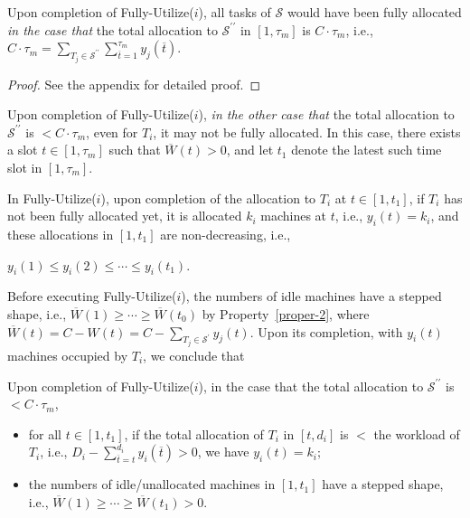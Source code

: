 \documentclass[10pt,journal,compsoc]{IEEEtran}
\begin{document}
\begin{lemma}\label{exit-condition-1}
Upon completion of Fully-Utilize($i$), all tasks of $\mathcal{S}$ would have been fully allocated {\em in the case that} the total allocation to $\mathcal{S}^{\prime\prime}$ in $[1, \tau_{m}]$ is $C\cdot\tau_{m}$, i.e., $C\cdot\tau_{m} = \sum_{T_{j}\in\mathcal{S}^{\prime\prime}}{\sum_{\overline{t}=1}^{\tau_{m}}{y_{j}(\overline{t})}}$.
\end{lemma}
\begin{proof}
See the appendix for detailed proof.
\end{proof}










Upon completion of Fully-Utilize($i$), {\em in the other case that} the total allocation to $\mathcal{S}^{\prime\prime}$ is $< C\cdot\tau_{m}$, even for $T_{i}$, it may not be fully allocated. In this case, there exists a slot $t\in [1, \tau_{m}]$ such that $\overline{W}(t)>0$, and let $t_{1}$ denote the latest such time slot in $[1, \tau_{m}]$.


In Fully-Utilize($i$), upon completion of the allocation to $T_{i}$ at $t\in [1, t_{1}]$, if $T_{i}$ has not been fully allocated yet, it is allocated $k_{i}$ machines at $t$, i.e., $y_{i}(t)=k_{i}$, and these allocations in $[1, t_{1}]$ are non-decreasing, i.e.,
\begin{center}
$y_{i}(1)\leq y_{i}(2)\leq \cdots\leq y_{i}(t_{1})$.
\end{center}
Before executing Fully-Utilize($i$), the numbers of idle machines have a stepped shape, i.e., $\overline{W}(1)\geq \cdots\geq \overline{W}(t_{0})$ by Property~\ref{proper-2}, where $\overline{W}(t)=C-W(t)=C-\sum_{T_{j}\in\mathcal{S}^{\prime}}{y_{j}(t)}$. Upon its completion, with $y_{i}(t)$ machines occupied by $T_{i}$, we conclude that





\begin{lemma}\label{lemma-fully-utilize}
Upon completion of Fully-Utilize($i$), in the case that the total allocation to $\mathcal{S}^{\prime\prime}$ is $< C\cdot\tau_{m}$,
\begin{itemize}
 \setlength\itemsep{0.3em}
  \item for all $t\in[1, t_{1}]$, if the total allocation of $T_{i}$ in $[t, d_{i}]$ is $<$ the workload of $T_{i}$, i.e.,  $D_{i}-\sum_{\overline{t}=t}^{d_{i}}{y_{i}(\overline{t})}>0$, we have $y_{i}(t)=k_{i}$;

  \item the numbers of idle/unallocated machines in $[1, t_{1}]$ have a stepped shape, i.e., $\overline{W}(1)\geq \cdots \geq \overline{W}(t_{1})>0$.
\end{itemize}
\end{lemma}
\end{document}
